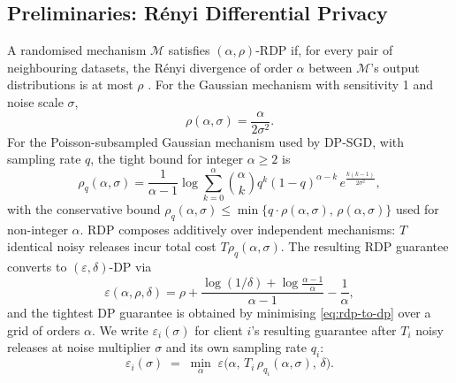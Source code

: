 \documentclass[journal]{IEEEtran}
\begin{document}
\subsection{Preliminaries: Rényi Differential Privacy}
\label{sec:prelim}
A randomised mechanism $\mathcal{M}$ satisfies $(\alpha,\rho)$-RDP if,
for every pair of neighbouring datasets, the Rényi divergence of order
$\alpha$ between $\mathcal{M}$'s output distributions is at most
$\rho$ \cite{mironov2017}. For the Gaussian mechanism with sensitivity
1 and noise scale $\sigma$,
\begin{equation}
\rho(\alpha,\sigma) = \frac{\alpha}{2\sigma^2}.
\label{eq:rdp-gaussian}
\end{equation}
For the Poisson-subsampled Gaussian mechanism used by DP-SGD, with
sampling rate $q$, the tight bound for integer $\alpha\ge2$
\cite{wang2019} is
\begin{equation}
\rho_q(\alpha,\sigma) = \frac{1}{\alpha-1}\log\!\sum_{k=0}^{\alpha}\binom{\alpha}{k} q^k (1-q)^{\alpha-k}\, e^{\frac{k(k-1)}{2\sigma^2}},
\label{eq:rdp-subsampled}
\end{equation}
with the conservative bound $\rho_q(\alpha,\sigma)\le\min\{q\cdot\rho(\alpha,\sigma),\,\rho(\alpha,\sigma)\}$
used for non-integer $\alpha$. RDP composes additively over independent
mechanisms: $T$ identical noisy releases incur total cost
$T\rho_q(\alpha,\sigma)$. The resulting RDP guarantee converts to
$(\varepsilon,\delta)$-DP via \cite{balle2020}
\begin{equation}
\varepsilon(\alpha,\rho,\delta) = \rho + \frac{\log(1/\delta) + \log\frac{\alpha-1}{\alpha}}{\alpha-1} - \frac{1}{\alpha},
\label{eq:rdp-to-dp}
\end{equation}
and the tightest DP guarantee is obtained by minimising
\eqref{eq:rdp-to-dp} over a grid of orders $\alpha$. We write
$\varepsilon_i(\sigma)$ for client $i$'s resulting guarantee after $T_i$
noisy releases at noise multiplier $\sigma$ and its own sampling rate
$q_i$:
\begin{equation}
\varepsilon_i(\sigma) \;=\; \min_{\alpha}\; \varepsilon\big(\alpha,\, T_i\,\rho_{q_i}(\alpha,\sigma),\, \delta\big).
\label{eq:eps-i}
\end{equation}
\end{document}
